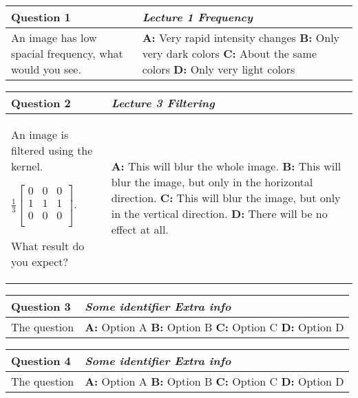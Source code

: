
\begin{tabular}{p{6cm}p{12.5cm}|} 
\textbf{Question 1} & \emph{Lecture 1 \hfill Frequency}  \\ \toprule  
An image has low spacial frequency, what would you see. & 
\textbf{A:} Very rapid intensity changes \newline 
\textbf{B:} Only very dark colors \newline  
\textbf{C:} About the same colors \newline  
\textbf{D:} Only very light colors \\ \bottomrule 
\end{tabular}


\begin{tabular}{p{6cm}p{12.5cm}|} 
\textbf{Question 2} & \emph{Lecture 3 \hfill Filtering}  \\ \toprule  
An image is filtered using the kernel. 
	
	$
	\frac{1}{3}
	\left[
		\begin{array}{ccc}
			0 & 0 & 0 \\
			1 & 1 & 1 \\
			0 & 0 & 0 \\
		\end{array}
	\right]
	.$
	
	What result do you expect? & 
\textbf{A:} This will blur the whole image. \newline 
\textbf{B:} This will blur the image, but only in the horizontal direction. \newline  
\textbf{C:} This will blur the image, but only in the vertical direction. \newline  
\textbf{D:} There will be no effect at all. \\ \bottomrule 
\end{tabular}


\begin{tabular}{p{6cm}p{12.5cm}|} 
\textbf{Question 3} & \emph{Some identifier \hfill Extra info}  \\ \toprule  
The question & 
\textbf{A:} Option A \newline 
\textbf{B:} Option B \newline  
\textbf{C:} Option C \newline  
\textbf{D:} Option D \\ \bottomrule 
\end{tabular}


\begin{tabular}{p{6cm}p{12.5cm}|} 
\textbf{Question 4} & \emph{Some identifier \hfill Extra info}  \\ \toprule  
The question & 
\textbf{A:} Option A \newline 
\textbf{B:} Option B \newline  
\textbf{C:} Option C \newline  
\textbf{D:} Option D \\ \bottomrule 
\end{tabular}


